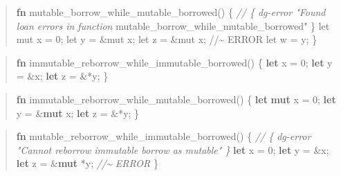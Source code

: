 \documentclass[
  11pt,
  twoside]{report}
\newenvironment{Shaded}{}{}
\newcommand{\CommentTok}[1]{\textit{#1}}
\newcommand{\DecValTok}[1]{#1}
\newcommand{\KeywordTok}[1]{\textbf{#1}}
\newcommand{\NormalTok}[1]{#1}
\newcommand{\OperatorTok}[1]{#1}
\newcommand{\StringTok}[1]{#1}
\begin{document}
\begin{quote}
\begin{Shaded}
\begin{Highlighting}[]
\KeywordTok{fn}\NormalTok{ mutable\_borrow\_while\_mutable\_borrowed() }\OperatorTok{\{}
    \CommentTok{// \{ dg{-}error "Found loan errors in function}
\NormalTok{         mutable\_borrow\_while\_mutable\_borrowed}\StringTok{" \}}
\StringTok{    let mut x = 0;}
\StringTok{    let y = \&mut x;}
\StringTok{    let z = \&mut x; //\textasciitilde{} ERROR}
\StringTok{    let w = y;}
\StringTok{\}}
\end{Highlighting}
\end{Shaded}
\end{quote}

\begin{quote}
\begin{Shaded}
\begin{Highlighting}[]
\KeywordTok{fn}\NormalTok{ immutable\_reborrow\_while\_immutable\_borrowed() }\OperatorTok{\{}
    \KeywordTok{let}\NormalTok{ x }\OperatorTok{=} \DecValTok{0}\OperatorTok{;}
    \KeywordTok{let}\NormalTok{ y }\OperatorTok{=} \OperatorTok{\&}\NormalTok{x}\OperatorTok{;}
    \KeywordTok{let}\NormalTok{ z }\OperatorTok{=} \OperatorTok{\&*}\NormalTok{y}\OperatorTok{;}
\OperatorTok{\}}
\end{Highlighting}
\end{Shaded}
\end{quote}

\begin{quote}
\begin{Shaded}
\begin{Highlighting}[]
\KeywordTok{fn}\NormalTok{ immutable\_reborrow\_while\_mutable\_borrowed() }\OperatorTok{\{}
    \KeywordTok{let} \KeywordTok{mut}\NormalTok{ x }\OperatorTok{=} \DecValTok{0}\OperatorTok{;}
    \KeywordTok{let}\NormalTok{ y }\OperatorTok{=} \OperatorTok{\&}\KeywordTok{mut}\NormalTok{ x}\OperatorTok{;}
    \KeywordTok{let}\NormalTok{ z }\OperatorTok{=} \OperatorTok{\&*}\NormalTok{y}\OperatorTok{;}
\OperatorTok{\}}
\end{Highlighting}
\end{Shaded}
\end{quote}

\begin{quote}
\begin{Shaded}
\begin{Highlighting}[]
\KeywordTok{fn}\NormalTok{ mutable\_reborrow\_while\_immutable\_borrowed() }\OperatorTok{\{}
    \CommentTok{// \{ dg{-}error "Cannot reborrow immutable borrow as mutable" \}}
    \KeywordTok{let}\NormalTok{ x }\OperatorTok{=} \DecValTok{0}\OperatorTok{;}
    \KeywordTok{let}\NormalTok{ y }\OperatorTok{=} \OperatorTok{\&}\NormalTok{x}\OperatorTok{;}
    \KeywordTok{let}\NormalTok{ z }\OperatorTok{=} \OperatorTok{\&}\KeywordTok{mut} \OperatorTok{*}\NormalTok{y}\OperatorTok{;} \CommentTok{//\textasciitilde{} ERROR}
\OperatorTok{\}}
\end{Highlighting}
\end{Shaded}
\end{quote}
\end{document}
